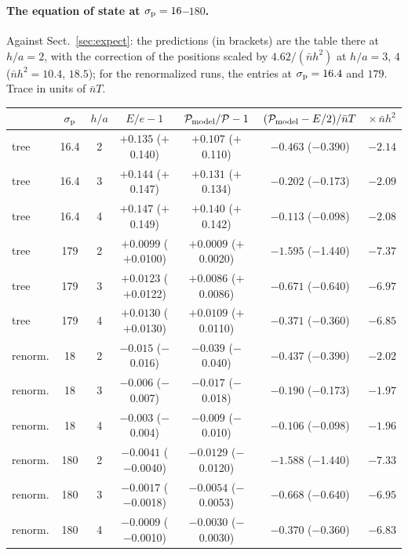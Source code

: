 \documentclass[11pt,aps,preprint,nofootinbib,superscriptaddress,tightenlines]{revtex4-2}
\def\pr{{\mathcal P}}
\def\er{e}
\def\Sect#1{Sect.~\ref{#1}}
\let\oldparagraph\paragraph
\renewcommand{\paragraph}{\par\bigskip\oldparagraph}
\begin{document}
\paragraph{The equation of state at $\sigma_{\rm p}=16$--$180$.}  Against \Sect{sec:expect}: the predictions (in brackets) are the table there at $h/a=2$, with the
correction of the positions scaled by $4.62/(\bar nh^2)$ at $h/a=3$, $4$ ($\bar nh^2=10.4$, $18.5$); for the renormalized runs, the entries at $\sigma_{\rm p}=16.4$ and
$179$.  Trace in units of $\bar nT$.
\begin{center}
\small
\begin{tabular}{lcccccc}
\toprule
 & $\sigma_{\rm p}$ & $h/a$ & $E/\er-1$ & $\pr_{\rm model}/\pr-1$ & $(\pr_{\rm model}-E/2)/\bar nT$ & $\times\,\bar nh^2$ \\
\midrule
tree & 16.4 & 2 & $+0.135$ ($+$0.140) & $+0.107$ ($+$0.110) & $-0.463$ ($-$0.390) & $-2.14$ \\
tree & 16.4 & 3 & $+0.144$ ($+$0.147) & $+0.131$ ($+$0.134) & $-0.202$ ($-$0.173) & $-2.09$ \\
tree & 16.4 & 4 & $+0.147$ ($+$0.149) & $+0.140$ ($+$0.142) & $-0.113$ ($-$0.098) & $-2.08$ \\
tree & 179 & 2 & $+0.0099$ ($+$0.0100) & $+0.0009$ ($+$0.0020) & $-1.595$ ($-$1.440) & $-7.37$ \\
tree & 179 & 3 & $+0.0123$ ($+$0.0122) & $+0.0086$ ($+$0.0086) & $-0.671$ ($-$0.640) & $-6.97$ \\
tree & 179 & 4 & $+0.0130$ ($+$0.0130) & $+0.0109$ ($+$0.0110) & $-0.371$ ($-$0.360) & $-6.85$ \\
renorm. & 18 & 2 & $-0.015$ ($-$0.016) & $-0.039$ ($-$0.040) & $-0.437$ ($-$0.390) & $-2.02$ \\
renorm. & 18 & 3 & $-0.006$ ($-$0.007) & $-0.017$ ($-$0.018) & $-0.190$ ($-$0.173) & $-1.97$ \\
renorm. & 18 & 4 & $-0.003$ ($-$0.004) & $-0.009$ ($-$0.010) & $-0.106$ ($-$0.098) & $-1.96$ \\
renorm. & 180 & 2 & $-0.0041$ ($-$0.0040) & $-0.0129$ ($-$0.0120) & $-1.588$ ($-$1.440) & $-7.33$ \\
renorm. & 180 & 3 & $-0.0017$ ($-$0.0018) & $-0.0054$ ($-$0.0053) & $-0.668$ ($-$0.640) & $-6.95$ \\
renorm. & 180 & 4 & $-0.0009$ ($-$0.0010) & $-0.0030$ ($-$0.0030) & $-0.370$ ($-$0.360) & $-6.83$ \\
\bottomrule
\end{tabular}
\end{center}
\end{document}
